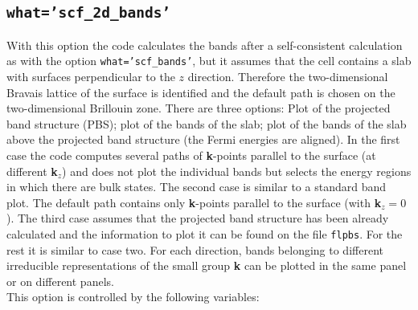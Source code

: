 \documentclass[12pt,a4paper]{article}
\begin{document}
\subsection{\color{web-blue}\texttt{what='scf\_2d\_bands'}}
With this option the code calculates the bands after a self-consistent 
calculation as with the option \texttt{what='scf\_bands'}, but it assumes 
that the cell contains a slab with surfaces perpendicular to the $z$ 
direction. Therefore the two-dimensional Bravais lattice of the surface 
is identified and the default path is chosen on the two-dimensional 
Brillouin zone. 
There are three options: Plot of the projected band structure (PBS); 
plot of the bands of the slab; plot of the bands of the slab above the
projected band structure (the Fermi energies are aligned). In the first 
case the code computes several paths
of {\bf k}-points parallel to the surface (at different {\bf k}$_z$) and does 
not plot the individual bands but selects the energy regions in which 
there are bulk states. The second case is similar to a standard band plot. 
The default path contains only {\bf k}-points parallel to the 
surface (with {\bf k}$_z=0$). The third case assumes that the projected band 
structure has been already calculated and the information to plot it 
can be found on the file \texttt{flpbs}. For the rest it is 
similar to case two. For each direction, bands belonging to different 
irreducible representations of the small group {\bf k} can be plotted 
in the same panel or on different panels.\\
This option is controlled by the following variables:
\end{document}
